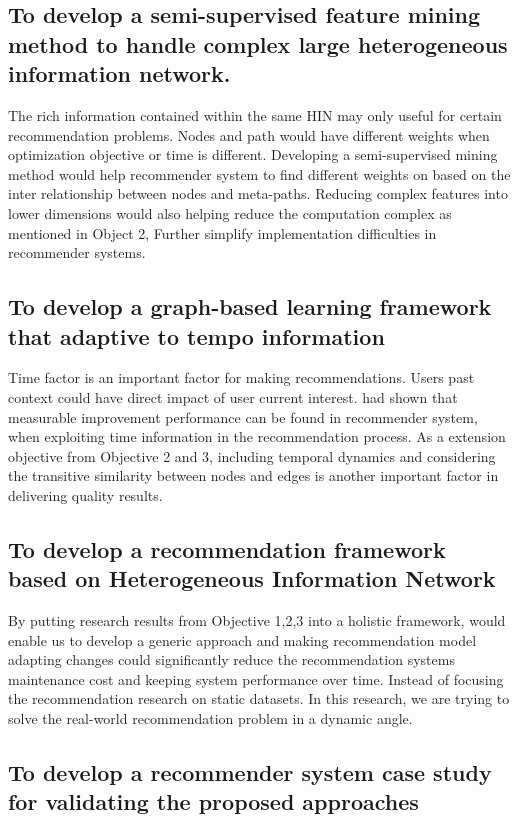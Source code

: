 \subsection{To develop a semi-supervised feature mining method to handle complex large heterogeneous information network.}

The rich information contained within the same HIN may only useful for certain recommendation problems. Nodes and path would have different weights when optimization objective or time is different. Developing a semi-supervised mining method would help recommender system to find different weights on based on the inter relationship between nodes and meta-paths. Reducing complex features into lower dimensions would also helping reduce the computation complex \citep{Cai2018} as mentioned in Object 2, Further simplify implementation difficulties in recommender systems. 

\subsection{To develop a graph-based learning framework that adaptive to tempo information}

Time factor is an important factor for making recommendations. Users past context could have direct impact of user current interest. \citet{Song2019} had shown that measurable improvement performance can be found in recommender system, when exploiting time information in the recommendation process. As a extension objective from Objective 2 and 3, including temporal dynamics and considering the transitive similarity between nodes and edges is another important factor in delivering quality results.

\subsection{To develop a recommendation framework based on Heterogeneous Information Network} 

By putting research results from Objective 1,2,3 into a holistic framework, would enable us to develop a generic approach and making recommendation model adapting changes could significantly reduce the recommendation systems maintenance cost and keeping system performance over time. 
Instead of focusing the recommendation research on static datasets. In this research, we are trying to solve the real-world recommendation problem in a dynamic angle.

\subsection{To develop a recommender system case study for validating the proposed approaches}

